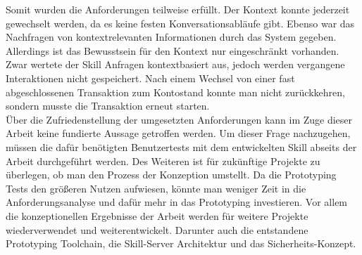 Somit wurden die Anforderungen teilweise erfüllt. Der Kontext konnte jederzeit gewechselt werden, da es keine festen Konversationsabläufe gibt. Ebenso war das Nachfragen von kontextrelevanten Informationen durch das System gegeben. Allerdings ist das Bewusstsein für den Kontext nur eingeschränkt vorhanden. Zwar wertete der Skill Anfragen kontextbasiert aus, jedoch werden vergangene Interaktionen nicht gespeichert. Nach einem Wechsel von einer fast abgeschlossenen Transaktion zum Kontostand konnte man nicht  zurückkehren, sondern musste die Transaktion erneut starten.\\ Über die Zufriedenstellung der umgesetzten Anforderungen kann im Zuge dieser Arbeit keine fundierte Aussage getroffen werden. Um dieser Frage nachzugehen, müssen die dafür benötigten Benutzertests mit dem entwickelten Skill abseits der Arbeit durchgeführt werden. Des Weiteren ist für zukünftige Projekte zu überlegen, ob man den Prozess der Konzeption umstellt. Da die Prototyping Tests den größeren Nutzen aufwiesen, könnte man weniger Zeit in die Anforderungsanalyse und dafür mehr in das Prototyping investieren. Vor allem die konzeptionellen Ergebnisse der Arbeit werden für weitere Projekte wiederverwendet und weiterentwickelt. Darunter auch die entstandene Prototyping Toolchain, die Skill-Server Architektur und das Sicherheits-Konzept.

